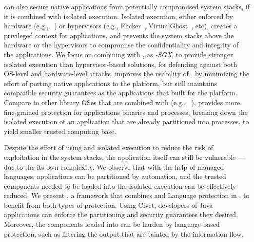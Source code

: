 \graphene{} \libos{} can also secure native applications from potentially compromised system stacks, if it is combined with isolated execution.
Isolated execution, either enforced by hardware (e.g., \intel{} \sgx{}~\citep{intelsgx}) or hypervisors (e.g., Flicker~\citep{flicker}, VirtualGhost~\citep{criswell2014virtualghost}, etc), creates a privileged context for applications,
and prevents the system stacks above the hardware or the hypervisors
to compromise the confidentiality and integrity of the applications.  
We focus on combining \graphene{} with \sgx{}, as {\em \graphene{}-SGX},
to provide stronger isolated execution than hypervisor-based solutions,
for defending against both OS-level and hardware-level attacks.
\gsgx{} improves the usability of \sgx{}, by minimizing the effort of porting native applications to the \sgx{} platform,
but still maintains compatible security guarantees as the applications that built for the platform.
Compare to other library OSes that are combined with \sgx{} (e.g., \haven{}~\citep{baumann14haven}),
\gsgx{} provides more fine-grained protection for applications binaries and processes,
breaking down the isolated execution of
an application that are already partitioned into processes,
to yield smaller trusted computing base.

Despite the effort of using \libos{} and isolated execution
to reduce the risk of exploitation in the system stacks,
the application itself can still be vulnerable
--- due to the its own complexity.
We observe that with the help of managed languages,
applications can be partitioned by automation,
and the trusted components needed to be loaded into the isolated execution
can be effectively reduced.
We present {\em \civet{}}, a framework that combines \sgx{} and Language protection in \java{},
to benefit from both types of protection.
Using Civet,
developers of Java applications can enforce the partitioning and security guarantees they desired.
Moreover, the components loaded into \sgx{} can be harden by language-based protection,
such as filtering the output
that are tainted by the information flow.

